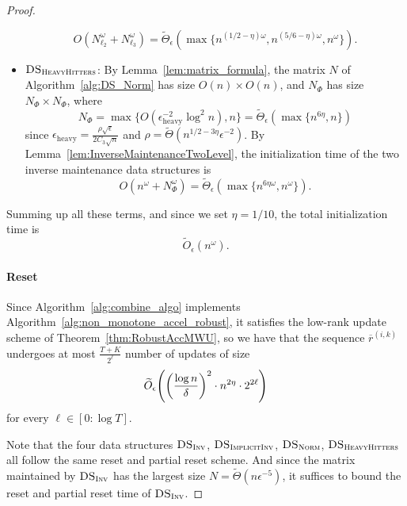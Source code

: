 \documentclass[11pt]{article}
\let\originalleft\left
\let\originalright\right
\renewcommand{\left}{\mathopen{}\mathclose\bgroup\originalleft}
\renewcommand{\right}{\aftergroup\egroup\originalright}
\newcommand\rr{\boldsymbol{\mathit{r}}}
\newcommand\NN{\boldsymbol{\mathit{N}}}
\newcommand\Otil{\widetilde{O}}
\newcommand{\wt}{\widetilde}
\newcommand{\ov}{\overline}
\newcommand{\heavy}{\text{heavy}}
\begin{document}
\begin{proof}
\begin{itemize}
\[O(N_{\ell_2}^{\omega} + N_{\ell_3}^{\omega}) = \wt{\Theta}_{\epsilon}(\max\{n^{(1/2-\eta) \omega}, n^{(5/6 - \eta) \omega}, n^{\omega}\}).
\]
\item $\textsc{DS}_{\textsc{HeavyHitters}}$: By Lemma~\ref{lem:matrix_formula}, the matrix $\NN$ of Algorithm~\ref{alg:DS_Norm} has size $O(n) \times O(n)$, and $\NN_{\Phi}$ has size $N_{\Phi} \times N_{\Phi}$, where
\[
N_{\Phi} = \max\{O(\epsilon_{\heavy}^{-2} \log^2 n), n\} = \wt{\Theta}_{\epsilon}(\max\{n^{6 \eta}, n\})
\]
since $\epsilon_{\heavy} = \frac{\rho \sqrt{\epsilon}}{2 C_3 \sqrt{n}}$ and $\rho = \widetilde{\Theta}(n^{1/2-3\eta}\epsilon^{-2})$. By Lemma~\ref{lem:InverseMaintenanceTwoLevel}, the initialization time of the two inverse maintenance data structures is
\[
O(n^{\omega} + N_{\Phi}^{\omega}) = \wt{\Theta}_{\epsilon}(\max\{n^{6 \eta \omega} , n^{\omega}\}).
\]
\end{itemize}
Summing up all these terms, and since we set $\eta = 1/10$, the total initialization time is
\[
\wt{O}_{\epsilon}(n^{\omega}).
\]

\paragraph{Reset} Since Algorithm~\ref{alg:combine_algo} implements Algorithm~\ref{alg:non_monotone_accel_robust}, it satisfies the low-rank update scheme of Theorem~\ref{thm:RobustAccMWU}, so we have that the sequence $\ov{\rr}^{(i,k)}$ undergoes at most $\frac{T+K}{2^{\ell}}$ 
number of updates of size 
\begin{equation}\label{eq:low_rank_update_size}
\Otil_{\epsilon}\left(\left(\frac{\log n}{\delta}\right)^2 \cdot n^{2 \eta} \cdot 2^{2 \ell}\right)
\end{equation}
for every $\ell \in [0:\log T]$. 

Note that the four data structures $\textsc{DS}_{\textsc{Inv}}$, $\textsc{DS}_{\textsc{ImplicitInv}}$, $\textsc{DS}_{\textsc{Norm}}$, $\textsc{DS}_{\textsc{HeavyHitters}}$ all follow the same reset and partial reset scheme. And since the matrix maintained by $\textsc{DS}_{\textsc{Inv}}$ has the largest size $N = \widetilde{\Theta}(n \epsilon^{-5} )$, it suffices to bound the reset and partial reset time of $\textsc{DS}_{\textsc{Inv}}$.


\end{proof}
\end{document}
